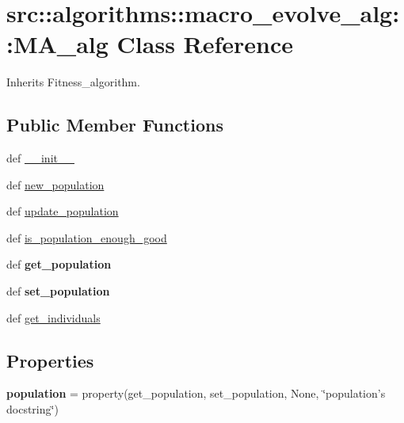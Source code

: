 \hypertarget{classsrc_1_1algorithms_1_1macro__evolve__alg_1_1MA__alg}{
\section{src::algorithms::macro\_\-evolve\_\-alg::MA\_\-alg Class Reference}
\label{classsrc_1_1algorithms_1_1macro__evolve__alg_1_1MA__alg}
}


Inherits Fitness\_\-algorithm.

\subsection*{Public Member Functions}
\begin{DoxyCompactItemize}
\item 
def \hyperlink{classsrc_1_1algorithms_1_1macro__evolve__alg_1_1MA__alg_a3c81449236c563b745d6cb51c11149e4}{\_\-\_\-init\_\-\_\-}
\item 
def \hyperlink{classsrc_1_1algorithms_1_1macro__evolve__alg_1_1MA__alg_a42269689ac49d997d0e914253b630ea3}{new\_\-population}
\item 
def \hyperlink{classsrc_1_1algorithms_1_1macro__evolve__alg_1_1MA__alg_a029fca99efd595e2164384dc5a0e02de}{update\_\-population}
\item 
def \hyperlink{classsrc_1_1algorithms_1_1macro__evolve__alg_1_1MA__alg_ae9fd4a9a985d2e46f7d8053cf1faa02a}{is\_\-population\_\-enough\_\-good}
\item 
\hypertarget{classsrc_1_1algorithms_1_1macro__evolve__alg_1_1MA__alg_a3be5585c9ba0c4c639d03754aa1a30c7}{
def {\bfseries get\_\-population}}
\label{classsrc_1_1algorithms_1_1macro__evolve__alg_1_1MA__alg_a3be5585c9ba0c4c639d03754aa1a30c7}

\item 
\hypertarget{classsrc_1_1algorithms_1_1macro__evolve__alg_1_1MA__alg_a00fdcee9f3304d6cd91c7d539f76c4ab}{
def {\bfseries set\_\-population}}
\label{classsrc_1_1algorithms_1_1macro__evolve__alg_1_1MA__alg_a00fdcee9f3304d6cd91c7d539f76c4ab}

\item 
def \hyperlink{classsrc_1_1algorithms_1_1macro__evolve__alg_1_1MA__alg_ab636057663103b3c0697996b1bde69f2}{get\_\-individuals}
\end{DoxyCompactItemize}
\subsection*{Properties}
\begin{DoxyCompactItemize}
\item 
\hypertarget{classsrc_1_1algorithms_1_1macro__evolve__alg_1_1MA__alg_a88c0eb7a6c1ee48ce398f3b5ebc2fbda}{
{\bfseries population} = property(get\_\-population, set\_\-population, None, \char`\"{}population's docstring\char`\"{})}
\label{classsrc_1_1algorithms_1_1macro__evolve__alg_1_1MA__alg_a88c0eb7a6c1ee48ce398f3b5ebc2fbda}

\end{DoxyCompactItemize}


